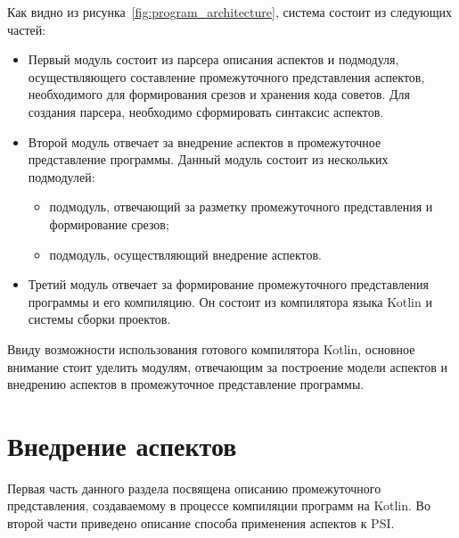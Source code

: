 Как видно из рисунка~\ref{fig:program_architecture}, система состоит из
следующих частей:
\begin{itemize}
	\item Первый модуль состоит из парсера описания аспектов и подмодуля, осуществляющего составление промежуточного представления аспектов, необходимого для формирования срезов и хранения кода советов.
	Для создания парсера, необходимо сформировать синтаксис аспектов.
	\item Второй модуль отвечает за внедрение аспектов в промежуточное представление программы.
		Данный модуль состоит из нескольких подмодулей: 
		\begin{itemize}
		 	\item подмодуль, отвечающий за разметку промежуточного представления и формирование срезов;
		 	\item подмодуль, осуществляющий внедрение аспектов.
		 \end{itemize} 
	\item Третий модуль отвечает за формирование промежуточного представления программы и его компиляцию.
	Он состоит из компилятора языка Kotlin и системы сборки проектов.
\end{itemize}

Ввиду возможности использования готового компилятора Kotlin, основное внимание стоит уделить модулям, отвечающим за построение модели аспектов и внедрению аспектов в промежуточное представление программы.
\section{Внедрение аспектов}
\label{sub:custom_aspect_weaving}
Первая часть данного раздела посвящена описанию промежуточного представления,
создаваемому в процессе компиляции программ на Kotlin.
Во второй части приведено описание способа применения аспектов к PSI.

